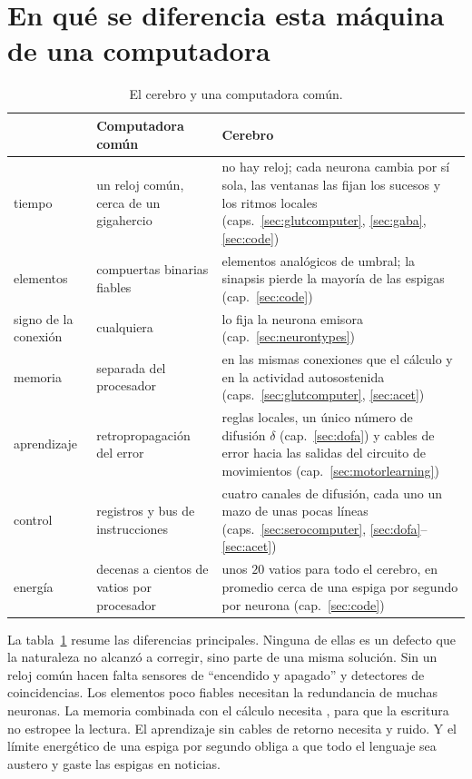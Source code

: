 \section{En qué se diferencia esta máquina de una computadora}

\begin{table}[t]
\centering
\footnotesize
\setlength{\tabcolsep}{4pt}
\renewcommand{\arraystretch}{1.15}
\begin{tabular}{>{\raggedright}p{2.2cm}>{\raggedright}p{4.2cm}>{\raggedright\arraybackslash}p{6.6cm}}
\toprule
& Computadora común & Cerebro \\
\midrule
tiempo & un reloj común, cerca de un gigahercio & no hay reloj; cada neurona cambia por sí sola, las ventanas las fijan los sucesos y los ritmos locales (caps.~\ref{sec:glutcomputer}, \ref{sec:gaba}, \ref{sec:code}) \\
elementos & compuertas binarias fiables & elementos analógicos de umbral; la sinapsis pierde la mayoría de las espigas (cap.~\ref{sec:code}) \\
signo de la conexión & cualquiera & lo fija la neurona emisora (cap.~\ref{sec:neurontypes}) \\
memoria & separada del procesador & en las mismas conexiones que el cálculo y en la actividad autosostenida (caps.~\ref{sec:glutcomputer}, \ref{sec:acet}) \\
aprendizaje & retropropagación del error & reglas locales, un único número de difusión $\delta$ (cap.~\ref{sec:dofa}) y cables de error hacia las salidas del circuito de movimientos (cap.~\ref{sec:motorlearning}) \\
control & registros y bus de instrucciones & cuatro canales de difusión, cada uno un mazo de unas pocas líneas (caps.~\ref{sec:serocomputer}, \ref{sec:dofa}--\ref{sec:acet}) \\
energía & decenas a cientos de vatios por procesador & unos $20$ vatios para todo el cerebro, en promedio cerca de una espiga por segundo por neurona (cap.~\ref{sec:code}) \\
\bottomrule
\end{tabular}
\caption{El cerebro y una computadora común.}
\label{tab:computer}
\end{table}

La tabla~\ref{tab:computer} resume las diferencias principales. Ninguna de ellas es un defecto que la naturaleza no alcanzó a corregir, sino parte de una misma solución. Sin un reloj común hacen falta sensores de “encendido y apagado” y detectores de coincidencias. Los elementos poco fiables necesitan la redundancia de muchas neuronas. La memoria combinada con el cálculo necesita , para que la escritura no estropee la lectura. El aprendizaje sin cables de retorno necesita  y ruido. Y el límite energético de una espiga por segundo obliga a que todo el lenguaje sea austero y gaste las espigas en noticias.

